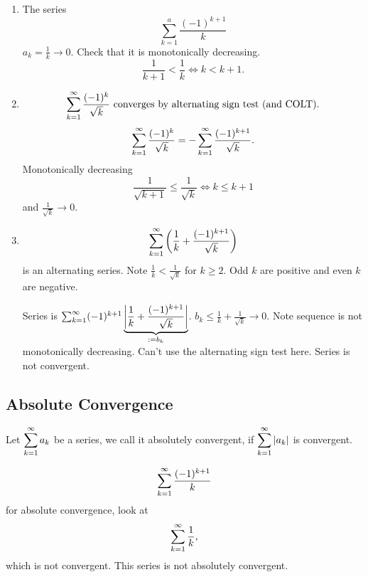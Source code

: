 \documentclass[10pt, a4paper]{article}
\begin{document}
\begin{example}
    \begin{enumerate}[label = (\alph*)]
        \item The series
        \[
        \sum_{k = 1}^{a}\frac{(-1) ^ {k + 1}}{k}
        \]
        $a_k = \frac{1}{k} \rightarrow 0$.
        Check that it is monotonically decreasing.
        \[
        \frac{1}{k + 1} < \frac{1}{k} \iff k < k + 1.
        \]
        \item
        \[
        \infsum[k = 1]\frac{(-1) ^ k}{\sqrt{k}}\text{ converges by alternating sign test (and COLT)}.
        \]
        \[
        \infsum[k = 1]\frac{(-1) ^ k}{\sqrt{k}} = -\infsum[k = 1]\frac{(-1) ^ {k + 1}}{\sqrt{k}}.
        \]
        Monotonically decreasing
        \[
        \frac{1}{\sqrt{k + 1}} \leq \frac{1}{\sqrt{k}} \iff k \leq k + 1
        \]
        and $\frac{1}{\sqrt{k}} \rightarrow 0$.
        \item
        \[
        \infsum[k = 1]\left(\frac{1}{k} + \frac{(-1) ^ {k + 1}}{\sqrt{k}}\right)
        \]
        is an alternating series.
        Note $\frac{1}{k} < \frac{1}{\sqrt{k}}$ for $k \geq 2$.
        Odd $k$ are positive and even $k$ are negative.
        
        Series is $\infsum[k = 1](-1) ^ {k + 1}\underbrace{\left|\frac{1}{k} + \frac{(-1) ^ {k + 1}}{\sqrt{k}}\right|}_{:= b_k}$.
        $b_k \leq \frac{1}{k} + \frac{1}{\sqrt{k}} \rightarrow 0$.
        Note sequence is not monotonically decreasing.
        Can't use the alternating sign test here.
        Series is not convergent.
    \end{enumerate}
\end{example}

\subsection{Absolute Convergence}
\begin{definition}
    Let $\displaystyle\infsum[k = 1]a_k$ be a series,
    we call it absolutely convergent,
    if $\displaystyle\infsum[k = 1]|a_k|$ is convergent.
\end{definition}

\begin{example}
    \[
    \infsum[k = 1]\frac{(-1) ^ {k + 1}}{k}
    \]
    for absolute convergence,
    look at
    \[
    \infsum[k = 1]\frac{1}{k},
    \]
    which is not convergent.
    This series is not absolutely convergent.
\end{example}
\end{document}
